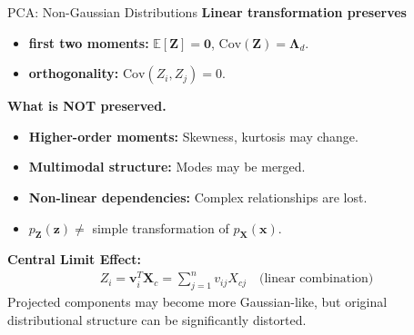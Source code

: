 \documentclass{beamer}
\begin{document}
\begin{frame}{PCA: Non-Gaussian Distributions}
  \textbf{Linear transformation preserves}
\begin{itemize}
  \item \textbf{first two moments:} $\mathbb{E}[\mathbf{Z}] = \mathbf{0}$, $\text{Cov}(\mathbf{Z}) = \boldsymbol{\Lambda}_d$.
  \item \textbf{orthogonality:} $\text{Cov}(Z_i, Z_j) = 0$.
\end{itemize}
  \vspace{0.2cm}
  \textbf{What is NOT preserved.}
  \begin{itemize}
    \item \textbf{Higher-order moments:} Skewness, kurtosis may change.
    \item \textbf{Multimodal structure:} Modes may be merged.
    \item \textbf{Non-linear dependencies:} Complex relationships are lost.
    \item $p_{\mathbf{Z}}(\mathbf{z}) \neq$ simple transformation of $p_{\mathbf{X}}(\mathbf{x})$.
  \end{itemize}
  \vspace{0.2cm}
  \textbf{Central Limit Effect:}
  \begin{align*}
    Z_i = \mathbf{v}_i^T\mathbf{X}_c = \sum_{j=1}^{n} v_{ij}X_{cj} \quad \text{(linear combination)}
  \end{align*}
  \alert{Projected components may become more Gaussian-like, but original distributional structure can be significantly distorted.}
\end{frame}
\end{document}
